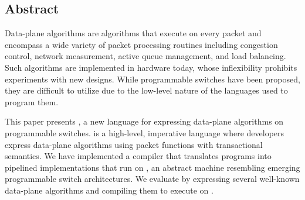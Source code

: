 \subsection*{Abstract}

Data-plane algorithms are algorithms that execute on every packet and encompass
a wide variety of packet processing routines including congestion control,
network measurement, active queue management, and load balancing. Such 
algorithms are implemented in hardware today, whose inflexibility prohibits
experiments with new designs. While programmable switches have been proposed, 
they are difficult to utilize due to the low-level nature of the languages
used to program them.

This paper presents \pktlanguage, a new language for expressing data-plane
algorithms on programmable switches. \pktlanguage is a high-level, imperative
language where developers express data-plane algorithms using packet functions
with transactional semantics. We have implemented a compiler that translates
\pktlanguage programs into pipelined implementations that run on \absmachine,
an abstract machine resembling emerging programmable switch architectures. We
evaluate \pktlanguage by expressing several well-known data-plane algorithms
and compiling them to execute on \absmachine.
